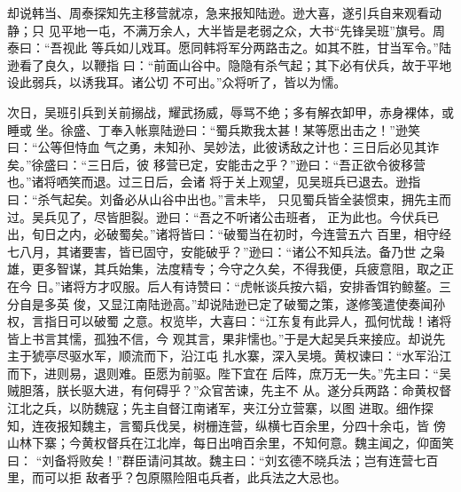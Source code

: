 \documentclass[UTF8,12pt,twoside,a4paper]{ctexart} %
\begin{document}
	
	\begin{flushleft}%


\indent\setlength{\parindent}{2em}%
						\songti
						\hspace{1.6em}%
却说韩当、周泰探知先主移营就凉，急来报知陆逊。逊大喜，遂引兵自来观看动静；只
见平地一屯，不满万余人，大半皆是老弱之众，大书“先锋吴班”旗号。周泰曰：“吾视此
等兵如儿戏耳。愿同韩将军分两路击之。如其不胜，甘当军令。”陆逊看了良久，以鞭指
曰：“前面山谷中。隐隐有杀气起；其下必有伏兵，故于平地设此弱兵，以诱我耳。诸公切
不可出。”众将听了，皆以为懦。

次日，吴班引兵到关前搦战，耀武扬威，辱骂不绝；多有解衣卸甲，赤身裸体，或睡或
坐。徐盛、丁奉入帐禀陆逊曰：“蜀兵欺我太甚！某等愿出击之！”逊笑曰：“公等但恃血
气之勇，未知孙、吴妙法，此彼诱敌之计也：三日后必见其诈矣。”徐盛曰：“三日后，彼
移营已定，安能击之乎？”逊曰：“吾正欲令彼移营也。”诸将哂笑而退。过三日后，会诸
将于关上观望，见吴班兵已退去。逊指曰：“杀气起矣。刘备必从山谷中出也。”言未毕，
只见蜀兵皆全装惯束，拥先主而过。吴兵见了，尽皆胆裂。逊曰：“吾之不听诸公击班者，
正为此也。今伏兵已出，旬日之内，必破蜀矣。”诸将皆曰：“破蜀当在初时，今连营五六
百里，相守经七八月，其诸要害，皆已固守，安能破乎？”逊曰：“诸公不知兵法。备乃世
之枭雄，更多智谋，其兵始集，法度精专；今守之久矣，不得我便，兵疲意阻，取之正在今
日。”诸将方才叹服。后人有诗赞曰：“虎帐谈兵按六韬，安排香饵钓鲸鳌。三分自是多英
俊，又显江南陆逊高。”却说陆逊已定了破蜀之策，遂修笺遣使奏闻孙权，言指日可以破蜀
之意。权览毕，大喜曰：“江东复有此异人，孤何忧哉！诸将皆上书言其懦，孤独不信，今
观其言，果非懦也。”于是大起吴兵来接应。却说先主于猇亭尽驱水军，顺流而下，沿江屯
扎水寨，深入吴境。黄权谏曰：“水军沿江而下，进则易，退则难。臣愿为前驱。陛下宜在
后阵，庶万无一失。”先主曰：“吴贼胆落，朕长驱大进，有何碍乎？”众官苦谏，先主不
从。遂分兵两路：命黄权督江北之兵，以防魏寇；先主自督江南诸军，夹江分立营寨，以图
进取。细作探知，连夜报知魏主，言蜀兵伐吴，树栅连营，纵横七百余里，分四十余屯，皆
傍山林下寨；今黄权督兵在江北岸，每日出哨百余里，不知何意。魏主闻之，仰面笑曰：
“刘备将败矣！”群臣请问其故。魏主曰：“刘玄德不晓兵法；岂有连营七百里，而可以拒
敌者乎？包原隰险阻屯兵者，此兵法之大忌也。\cite{RN1}

	\end{flushleft}%
\end{document}
